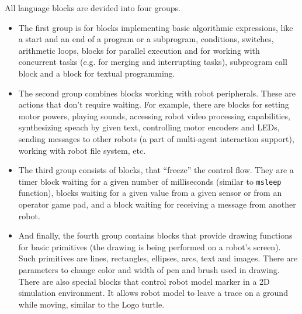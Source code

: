 \documentclass[conference]{IEEEtran}
\begin{document}
All language blocks are devided into four groups.

\begin{itemize}
    \item The first group is for blocks implementing basic algorithmic expressions, like a start and an end of a program or a subprogram, conditions, switches, arithmetic loops, blocks for parallel execution and for working with concurrent tasks (e.g. for merging and interrupting tasks), subprogram call block and a block for textual programming.
    \item The second group combines blocks working with robot peripherals. These are actions that don't require waiting. For example, there are blocks for setting motor powers, playing sounds, accessing robot video processing capabilities, synthesizing speach by given text, controlling motor encoders and LEDs, sending messages to other robots (a part of multi-agent interaction support), working with robot file system, etc.
    \item The third group consists of blocks, that ``freeze'' the control flow. They are a timer block waiting for a given number of milliseconds (similar to \texttt{msleep} function), blocks waiting for a given value from a given sensor or from an operator game pad, and a block waiting for receiving a message from another robot. 
    \item And finally, the fourth group contains blocks that provide drawing functions for basic primitives (the drawing is being performed on a robot's screen). Such primitives are lines, rectangles, ellipses, arcs, text and images. There are parameters to change color and width of pen and brush used in drawing. There are also special blocks that control robot model marker in a 2D simulation environment. It allows robot model to leave a trace on a ground while moving, similar to the Logo turtle.
\end{itemize}
\end{document}
